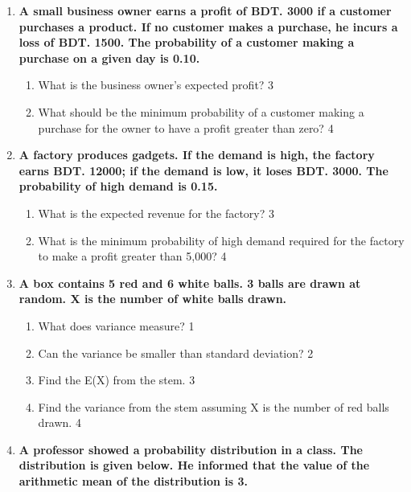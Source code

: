 \documentclass[a4paper,oneside]{book}
\begin{document}
\begin{enumerate}
  \item
\textbf{A small business owner earns a profit of BDT. 3000 if a customer purchases a product. If no customer makes a purchase, he incurs a loss of BDT. 1500. The probability of a customer making a purchase on a given day is 0.10.} 

\begin{enumerate}
    \item
    What is the business owner's expected profit? \hfill 3

    \item
    What should be the minimum probability of a customer making a purchase for the owner to have a profit greater than zero? \hfill 4
\end{enumerate}

\item
\textbf{A factory produces gadgets. If the demand is high, the factory earns BDT. 12000; if the demand is low, it loses BDT. 3000. The probability of high demand is 0.15.}

\begin{enumerate}
    \item
    What is the expected revenue for the factory? \hfill 3

    \item
    What is the minimum probability of high demand required for the factory to make a profit greater than 5,000? \hfill 4
\end{enumerate}

  
     \item
	  \textbf{A box contains 5 red and 6 white balls. 3 balls are drawn at random. X is the number of white balls drawn.} 
  
  \begin{enumerate}
    \item
	What does variance measure? \hfill 1
    \item
	Can the variance be smaller than standard deviation? \hfill 2
    \item  
	Find the E(X) from the stem. \hfill 3
    \item
	Find the variance from the stem assuming X is the number of red balls drawn. \hfill 4
  \end{enumerate}
  
   \item
	  \textbf{A professor showed a probability distribution in a class. The distribution is given below. He informed that the value of the arithmetic mean of the distribution is 3.}
	  

\end{enumerate}
\end{document}
